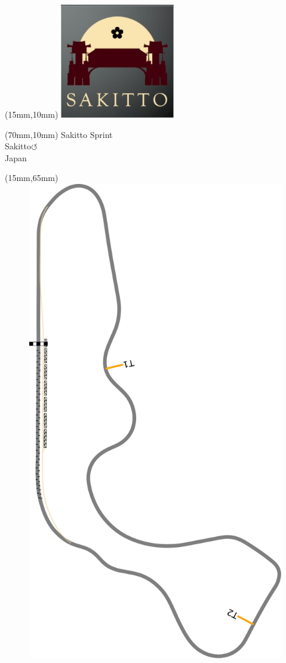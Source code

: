 \null\newpage
\begin{textblock*}{50mm}(15mm,10mm)%
\includegraphics[width=50mm]{LG/2015-05-20_00093.png}
\end{textblock*}
\begin{textblock*}{130mm}(70mm,10mm)%
{\fontsize{20}{20}\selectfont Sakitto Sprint\\}
{\fontsize{16}{16}\selectfont Sakitto\hfill \huge$\circlearrowleft$\\}
{\fontsize{12}{12}\selectfont Japan\\}
\end{textblock*}
\begin{textblock*}{185mm}(15mm,65mm)%
\centering
\mbox{\includegraphics[width=185mm,height=210mm,keepaspectratio]{PT/SASP.pdf}}
\end{textblock*}
